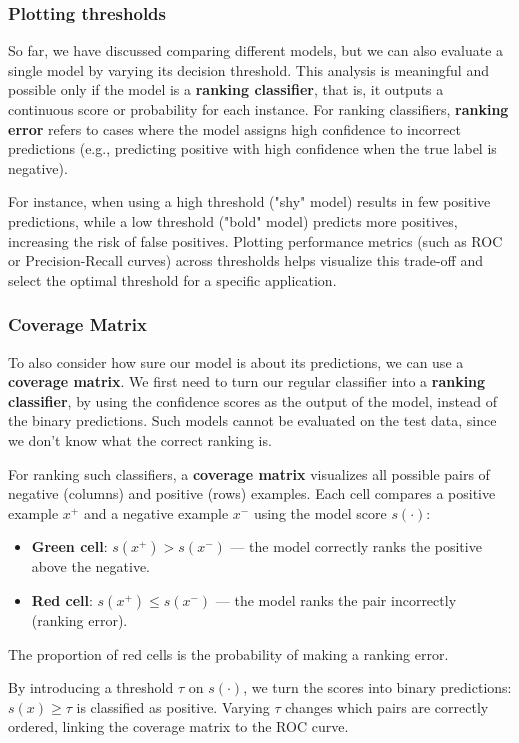 \subsubsection*{Plotting thresholds}
So far, we have discussed comparing different models, but we can also evaluate a single model by varying its decision threshold.
This analysis is meaningful and possible only if the model is a \textbf{ranking classifier}, that is, it outputs a continuous score or probability for each instance.
For ranking classifiers, \textbf{ranking error} refers to cases where the model assigns high confidence to incorrect predictions (e.g., predicting positive with high confidence when the true label is negative).

For instance, when using a high threshold ("shy" model) results in few positive predictions, while a low threshold ("bold" model) predicts more positives, increasing the risk of false positives.
Plotting performance metrics (such as ROC or Precision-Recall curves) across thresholds helps visualize this trade-off and select the optimal threshold for a specific application.

\subsubsection*{Coverage Matrix}
To also consider how sure our model is about its predictions, we can use a \textbf{coverage matrix}.
We first need to turn our regular classifier into a \textbf{ranking classifier}, by using the confidence scores as the output of the model,
instead of the binary predictions.
Such models cannot be evaluated on the test data, since we don't know what the correct ranking is.

For ranking such classifiers, a \textbf{coverage matrix} visualizes all possible pairs of negative (columns) and positive (rows) examples.
Each cell compares a positive example $x^+$ and a negative example $x^-$ using the model score $s(\cdot)$:
\begin{itemize}
    \item \textbf{Green cell}: $s(x^+) > s(x^-)$ — the model correctly ranks the positive above the negative.
    \item \textbf{Red cell}: $s(x^+) \leq s(x^-)$ — the model ranks the pair incorrectly (ranking error).
\end{itemize}
The proportion of red cells is the probability of making a ranking error.

By introducing a threshold $\tau$ on $s(\cdot)$, we turn the scores into binary predictions: $s(x) \geq \tau$ is classified as positive. 
Varying $\tau$ changes which pairs are correctly ordered, linking the coverage matrix to the ROC curve.

